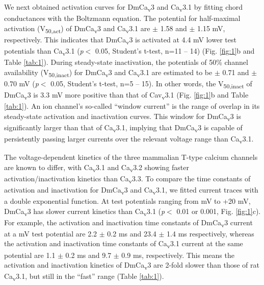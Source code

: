 We next obtained activation curves for DmCa\textsubscript{v}3 and Ca\textsubscript{v}3.1 by fitting chord conductances with the Boltzmann equation. The potential for half-maximal activation (V\textsubscript{50,act}) of DmCa\textsubscript{v}3 and Ca\textsubscript{v}3.1 are  $\pm$ 1.58 and  $\pm$ 1.15 mV, respectively. This indicates that DmCa\textsubscript{v}3 is activated at 4.4 mV lower test potentials than Ca\textsubscript{v}3.1 (\emph{p}$<$ 0.05, Student's t-test, n=11 -- 14) (Fig. \ref{fig:1}b and Table \ref{tab:1}).
During steady-state inactivation, the potentials of 50\% channel availability (V\textsubscript{50,inact}) for DmCa\textsubscript{v}3 and Ca\textsubscript{v}3.1 are estimated to be  $\pm$ 0.71 and  $\pm$ 0.70 mV (\emph{p}$<$ 0.05, Student's t-test, n=5 -- 15). In other words, the V\textsubscript{50,inact} of DmCa\textsubscript{v}3 is 3.3 mV more positive than that of Cav\textsubscript{v}3.1 (Fig. \ref{fig:1}b and Table \ref{tab:1}).
An ion channel's so-called ``window current'' is the range of overlap in its steady-state activation and inactivation curves. This window for DmCa\textsubscript{v}3 is significantly larger than that of Ca\textsubscript{v}3.1, implying that DmCa\textsubscript{v}3 is capable of persistently passing larger currents over the relevant voltage range than Ca\textsubscript{v}3.1.

The voltage-dependent kinetics of the three mammalian T-type calcium channels are known to differ, with Ca\textsubscript{v}3.1 and Ca\textsubscript{v}3.2 showing faster activation/inactivation kinetics than Ca\textsubscript{v}3.3\cite{klockner:1999aa}.
To compare the time constants of activation and inactivation for DmCa\textsubscript{v}3 and Ca\textsubscript{v}3.1, we fitted current traces with a double exponential function.
At test potentials ranging from  mV to +20 mV,  DmCa\textsubscript{v}3 has slower current kinetics than Ca\textsubscript{v}3.1 (\emph{p}$<$ 0.01 or 0.001, Fig. \ref{fig:1}c).
For example, the activation and inactivation time constants of DmCa\textsubscript{v}3 current at a  mV test potential are 2.2 $\pm$ 0.2 ms and 23.4 $\pm$ 1.4 ms respectively, whereas the activation and inactivation time constants of Ca\textsubscript{v}3.1 current at the same potential are 1.1 $\pm$ 0.2 ms and 9.7 $\pm$ 0.9 ms, respectively. This means the activation and inactivation kinetics of DmCa\textsubscript{v}3 are 2-fold slower than those of rat Ca\textsubscript{v}3.1, but still in the ``fast'' range (Table \ref{tab:1}).

